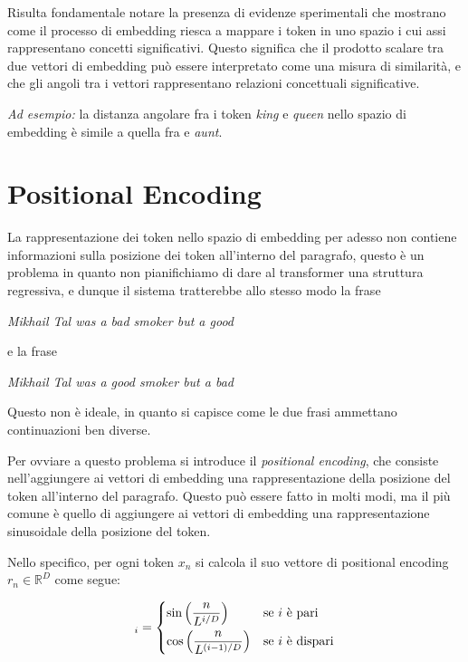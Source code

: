 Risulta fondamentale notare la presenza di evidenze sperimentali che mostrano come il processo di embedding riesca a mappare i token in uno spazio i cui assi rappresentano concetti significativi. Questo significa che il prodotto scalare tra due vettori di embedding può essere interpretato come una misura di similarità, e che gli angoli tra i vettori rappresentano relazioni concettuali significative.

\textit{Ad esempio:} la distanza angolare fra i token \textit{king} e \textit{queen} nello spazio di embedding è simile a quella fra  e \textit{aunt}.

\section{Positional Encoding}

La rappresentazione dei token nello spazio di embedding per adesso non contiene informazioni sulla posizione dei token all'interno del paragrafo, questo è un problema in quanto non pianifichiamo di dare al transformer una struttura regressiva, e dunque il sistema tratterebbe allo stesso modo la frase

\begin{center}
    \textit{Mikhail Tal was a bad smoker but a good}
\end{center}

e la frase

\begin{center}
    \textit{Mikhail Tal was a good smoker but a bad}
\end{center}

Questo non è ideale, in quanto si capisce come le due frasi ammettano continuazioni ben diverse.

Per ovviare a questo problema si introduce il \textit{positional encoding}, che consiste nell'aggiungere ai vettori di embedding una rappresentazione della posizione del token all'interno del paragrafo. Questo può essere fatto in molti modi, ma il più comune è quello di aggiungere ai vettori di embedding una rappresentazione sinusoidale della posizione del token.

Nello specifico, per ogni token \(x_n\) si calcola il suo vettore di positional encoding \(r_n \in \mathbb{R}^D\) come segue:

\begin{equation}
    [r_n]_i =
    \begin{dcases}
        \sin\left(\frac{n}{L^{i/D}}\right) & \text{se } i \text{ è pari} \\
        \cos\left(\frac{n}{L^{(i-1)/D}}\right) & \text{se } i \text{ è dispari}
    \end{dcases}
\end{equation}

